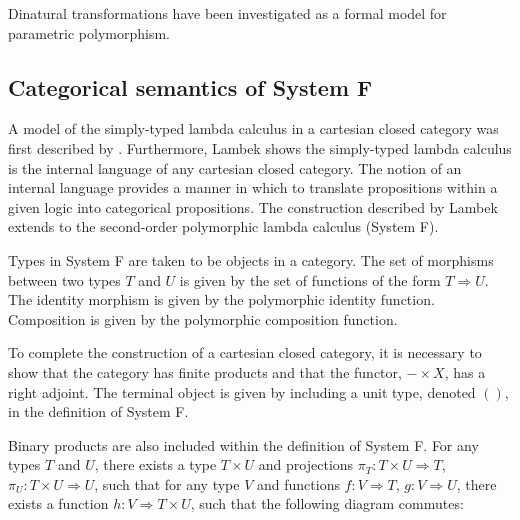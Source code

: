 \documentclass[../../Dissertation.tex]{subfiles}
\begin{document}
Dinatural transformations have been investigated as a formal model for parametric polymorphism.

\subsection{Categorical semantics of System F}
A model of the simply-typed lambda calculus in a cartesian closed category was first described by . Furthermore, Lambek shows the simply-typed lambda calculus is the internal language of any cartesian closed category. The notion of an internal language provides a manner in which to translate propositions within a given logic into categorical propositions. The construction described by Lambek extends to the second-order polymorphic lambda calculus (System F).
\par
Types in System F are taken to be objects in a category. The set of morphisms between two types $T$ and $U$ is given by the set of functions of the form $T \Rightarrow U$. The identity morphism is given by the polymorphic identity function. Composition is given by the polymorphic composition function.
\par
To complete the construction of a cartesian closed category, it is necessary to show that the category has finite products and that the functor, $- \times X$, has a right adjoint. The terminal object is given by including a unit type, denoted $()$, in the definition of System F. 
\par
Binary products are also included within the definition of System F. For any types $T$ and $U$, there exists a type $T \times U$ and projections $\pi_{T} : T \times U \Rightarrow T$, $\pi_{U} : T \times U \Rightarrow U$, such that for any type $V$ and functions $f : V \Rightarrow T$, $g : V \Rightarrow U$, there exists a function $h : V \Rightarrow T \times U$, such that the following diagram commutes:
\end{document}
